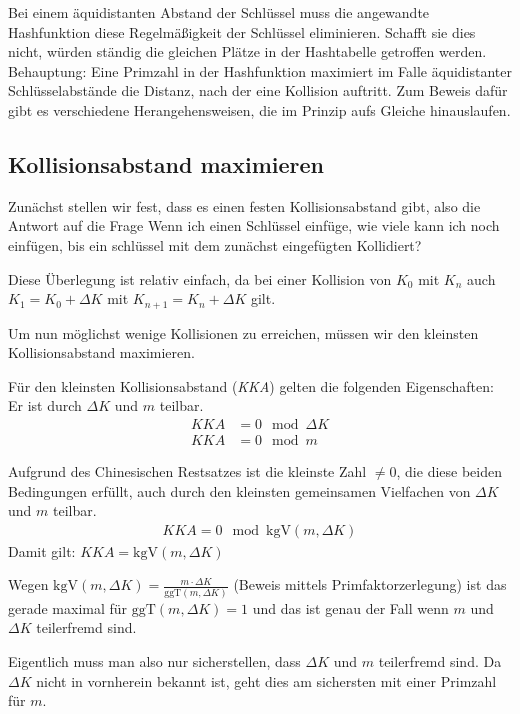 \begin{solution}
Bei einem äquidistanten Abstand der Schlüssel muss die angewandte Hashfunktion diese Regelmäßigkeit der Schlüssel eliminieren. Schafft sie dies nicht, würden ständig die gleichen Plätze in der Hashtabelle getroffen werden.
Behauptung: Eine Primzahl in der Hashfunktion maximiert im Falle äquidistanter Schlüsselabstände die Distanz, nach der eine Kollision auftritt.
Zum Beweis dafür gibt es verschiedene Herangehensweisen, die im Prinzip aufs Gleiche hinauslaufen.


\subsection{\color{solutioncolor}Kollisionsabstand maximieren}

Zunächst stellen wir fest, dass es einen festen Kollisionsabstand gibt, also die Antwort auf die Frage \glqq Wenn ich einen Schlüssel einfüge, wie viele kann ich noch einfügen, bis ein schlüssel mit dem zunächst eingefügten Kollidiert?\grqq

Diese Überlegung ist relativ einfach, da bei einer Kollision von $K_0$ mit $K_n$ auch $K_1 = K_0+\Delta K$ mit $K_{n+1} = K_n + \Delta K$ gilt.

Um nun möglichst wenige Kollisionen zu erreichen, müssen wir den kleinsten Kollisionsabstand maximieren.

Für den kleinsten Kollisionsabstand (\textit{KKA}) gelten die folgenden Eigenschaften:
Er ist durch $\Delta K$ und $m$ teilbar.
\begin{align*}
	\textit{KKA} &= 0 \mod \Delta K\\
	\textit{KKA} &= 0 \mod m
\end{align*}

Aufgrund des Chinesischen Restsatzes ist die kleinste Zahl $\neq 0$, die diese beiden Bedingungen erfüllt, auch durch den kleinsten gemeinsamen Vielfachen von $\Delta K$ und $m$ teilbar.
\begin{align*}
	\textit{KKA} = 0 \mod \mathrm{kgV}(m, \Delta K)
\end{align*}
Damit gilt: $\textit{KKA} = \mathrm{kgV}(m, \Delta K)$

Wegen $\mathrm{kgV}(m,\Delta K) = \frac{m \cdot \Delta K}{\mathrm{ggT}(m,\Delta K)}$ (Beweis mittels Primfaktorzerlegung) ist das gerade maximal für $\mathrm{ggT}(m,\Delta K)=1$ und das ist genau der Fall wenn $m$ und $\Delta K$ teilerfremd sind.

Eigentlich muss man also nur sicherstellen, dass $\Delta K$ und $m$ teilerfremd sind. Da $\Delta K$ nicht in vornherein bekannt ist, geht dies am sichersten mit einer Primzahl für $m$.


\end{solution}
